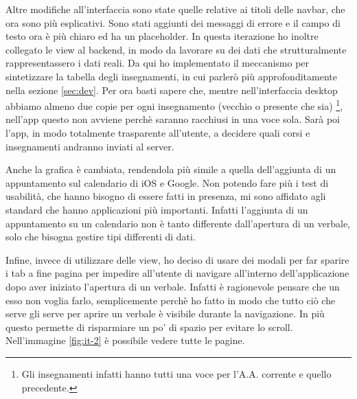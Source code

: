\documentclass[Lau, oneside, noexaminfo]{sapthesis}%
\begin{document}
Altre modifiche all'interfaccia sono state quelle relative ai titoli delle navbar, che ora sono più esplicativi. Sono stati aggiunti dei messaggi di errore e il campo di testo ora è più chiaro ed ha un placeholder. In questa iterazione ho inoltre collegato le view al backend, in modo da lavorare su dei dati che strutturalmente rappresentassero i dati reali. Da qui ho implementato il meccanismo per sintetizzare la tabella degli insegnamenti, in cui parlerò più approfonditamente nella sezione \ref{sec:dev}. Per ora basti sapere che, mentre nell'interfaccia desktop abbiamo almeno due copie per ogni insegnamento (vecchio o presente che sia) \footnote{Gli insegnamenti infatti hanno tutti una voce per l'A.A. corrente e quello precedente.}, nell'app questo non avviene perchè saranno racchiusi in una voce sola. Sarà poi l'app, in modo totalmente trasparente all'utente, a decidere quali corsi e insegnamenti andranno inviati al server.

Anche la grafica è cambiata, rendendola più simile a quella dell'aggiunta di un appuntamento sul calendario di iOS e Google. Non potendo fare più i test di usabilità, che hanno bisogno di essere fatti in presenza, mi sono affidato agli standard che hanno applicazioni più importanti. Infatti l'aggiunta di un appuntamento su un calendario non è tanto differente dall'apertura di un verbale, solo che bisogna gestire tipi differenti di dati.

Infine, invece di utilizzare delle view, ho deciso di usare dei modali per far sparire i tab a fine pagina per impedire all'utente di navigare all'interno dell'applicazione dopo aver iniziato l'apertura di un verbale. Infatti è ragionevole pensare che un esso non voglia farlo, semplicemente perchè ho fatto in modo che tutto ciò che serve gli serve per aprire un verbale è visibile durante la navigazione. In più questo permette di risparmiare un po' di spazio per evitare lo scroll. Nell'immagine \ref{fig:it-2} è possibile vedere tutte le pagine.
\end{document}
